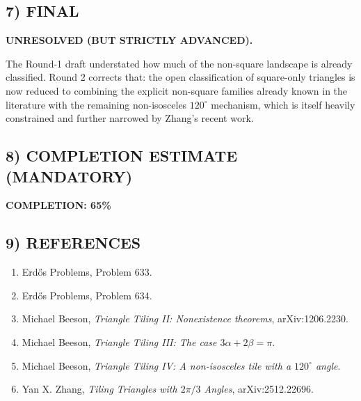 \subsection*{7) FINAL}
\textbf{UNRESOLVED (BUT STRICTLY ADVANCED).}

The Round-1 draft understated how much of the non-square landscape is already classified. Round 2 corrects that: the open classification of square-only triangles is now reduced to combining the explicit non-square families already known in the literature with the remaining non-isosceles $120^\circ$ mechanism, which is itself heavily constrained and further narrowed by Zhang's recent work.

\subsection*{8) COMPLETION ESTIMATE (MANDATORY)}
\textbf{COMPLETION: 65\%}

\subsection*{9) REFERENCES}
\begin{enumerate}
\item Erd\H{o}s Problems, Problem 633.
\item Erd\H{o}s Problems, Problem 634.
\item Michael Beeson, \emph{Triangle Tiling II: Nonexistence theorems}, arXiv:1206.2230.
\item Michael Beeson, \emph{Triangle Tiling III: The case $3\alpha+2\beta=\pi$}.
\item Michael Beeson, \emph{Triangle Tiling IV: A non-isosceles tile with a $120^\circ$ angle}.
\item Yan X. Zhang, \emph{Tiling Triangles with $2\pi/3$ Angles}, arXiv:2512.22696.
\end{enumerate}


